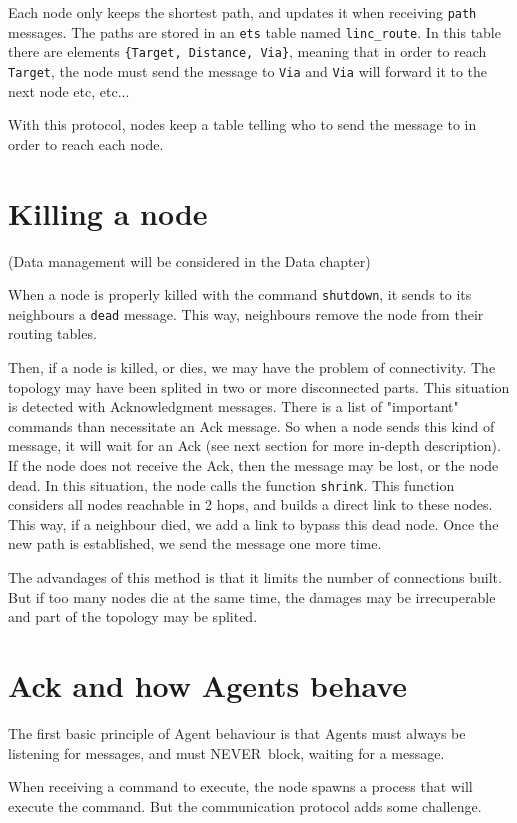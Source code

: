 \documentclass[a4paper,10pt]{report}
\begin{document}
Each node only keeps the shortest path, and updates it when receiving
\texttt{path} messages.
The paths are stored in an \texttt{ets} table named \texttt{linc\_route}.
In this table there are elements \texttt{\{Target, Distance, Via\}}, 
meaning that in order to reach \texttt{Target}, the node must send the
message to \texttt{Via} and \texttt{Via} will forward it to the next node
etc, etc...

With this protocol, nodes keep a table telling who to send the message
to in order to reach each node. 

\section{Killing a node}
(Data management will be considered in the Data chapter)

When a node is properly killed with the command \texttt{shutdown}, it 
sends to its neighbours a \texttt{dead} message. This way, neighbours
remove the node from their routing tables.

Then, if a node is killed, or dies, we may have the problem of connectivity.
The topology may have been splited in two or more disconnected parts.
This situation is detected with Acknowledgment messages. There is a list
of "important" commands than necessitate an Ack message. So when a node
sends this kind of message, it will wait for an Ack (see next section
for more in-depth description). If the node does not receive the Ack, then
the message may be lost, or the node dead. In this situation, the node
calls the function \texttt{shrink}. This function considers all nodes
reachable in 2 hops, and builds a direct link to these nodes. This way,
if a neighbour died, we add a link to bypass this dead node. 
Once the new path is established, we send the message one more time.

The advandages of this method is that it limits the number of connections
built. But if too many nodes die at the same time, the damages may be 
irrecuperable and part of the topology may be splited.

\section{Ack and how Agents behave}

The first basic principle of Agent behaviour is that Agents must always
be listening for messages, and must NEVER block, waiting for a message.

When receiving a command to execute, the node spawns a process that will
execute the command. But the communication protocol adds some challenge.
\end{document}
